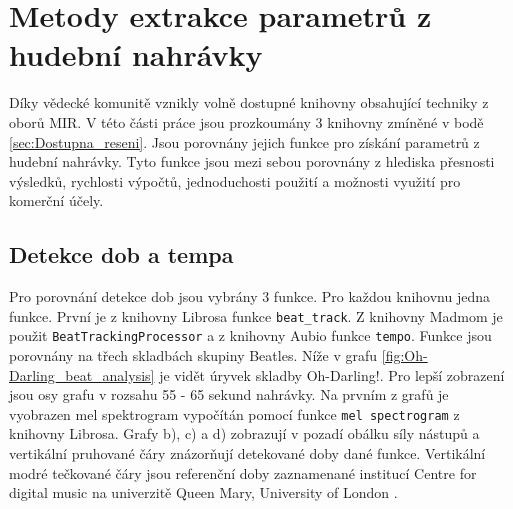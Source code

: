 \section{Metody extrakce parametrů z hudební nahrávky} \label{sec:Exktrakce_vlastnosti_metody}
Díky vědecké komunitě vznikly volně dostupné knihovny obsahující techniky z oborů \acs{MIR}. V této části práce jsou prozkoumány 3 knihovny zmíněné v bodě \ref{sec:Dostupna_reseni}. Jsou porovnány jejich funkce pro získání parametrů z hudební nahrávky. Tyto funkce jsou mezi sebou porovnány z hlediska přesnosti výsledků, rychlosti výpočtů, jednoduchosti použití a možnosti využití pro komerční účely. 


\subsection{Detekce dob a tempa}
Pro porovnání detekce dob jsou vybrány 3 funkce. Pro každou knihovnu jedna funkce. První je z knihovny Librosa funkce \texttt{beat\_track}. Z knihovny Madmom je použit \texttt{BeatTrackingProcessor} a z knihovny Aubio funkce \texttt{tempo}. Funkce jsou porovnány na třech skladbách skupiny Beatles. Níže v grafu \ref{fig:Oh-Darling_beat_analysis} je vidět úryvek skladby Oh-Darling!. Pro lepší zobrazení jsou osy grafu v rozsahu 55 - 65 sekund nahrávky. Na prvním z grafů je vyobrazen mel spektrogram vypočítán pomocí funkce \texttt{mel spectrogram} z knihovny Librosa. Grafy b), c) a d) zobrazují v pozadí obálku síly nástupů a vertikální pruhované čáry znázorňují detekované doby dané funkce. Vertikální modré tečkované čáry jsou referenční doby zaznamenané institucí Centre for digital music na univerzitě Queen Mary, University of London \cite{Isophonic}. 

